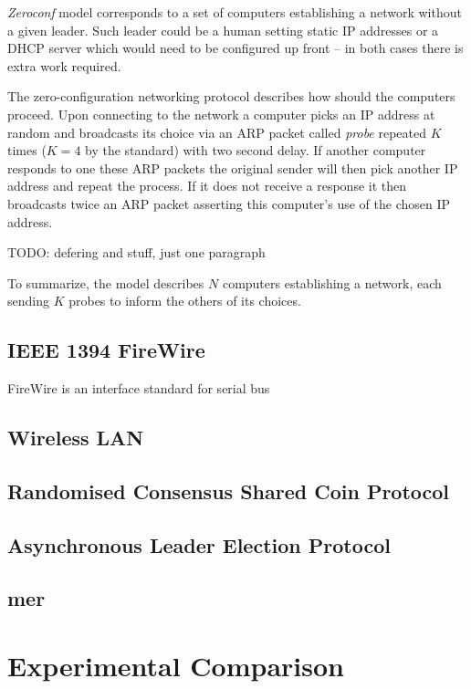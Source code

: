 {\em Zeroconf} model corresponds to a set of computers establishing a
network without a given leader. Such leader could be a human setting
static IP addresses or a DHCP server which would need to be configured
up front -- in both cases there is extra work required.

The zero-configuration networking protocol describes how should the
computers proceed. Upon connecting to the network a computer picks an IP
address at random and broadcasts its choice via an ARP packet called
{\em probe} repeated $K$ times ($K=4$ by the standard) with two second
delay. If another computer responds to one these
ARP packets the original sender will then pick another IP address and
repeat the process. If it does not receive a response it then broadcasts
twice an ARP packet asserting this computer's use of the chosen IP
address.

TODO: defering and stuff, just one paragraph

To summarize, the model describes $N$ computers establishing a network,
each sending $K$ probes to inform the others of its choices.

\subsection*{IEEE 1394 FireWire}

FireWire is an interface standard for serial bus

\subsection*{Wireless LAN}

\subsection*{Randomised Consensus Shared Coin Protocol}

\subsection*{Asynchronous Leader Election Protocol}

\subsection*{mer}

\section{Experimental Comparison}

